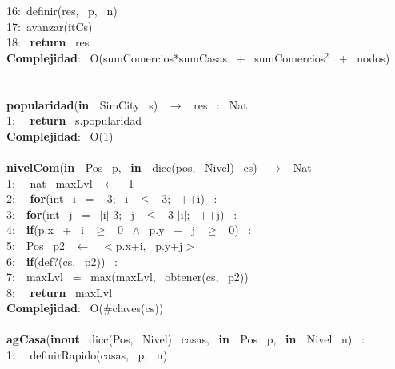 \begin{Algoritmos}
    16:\indent \indent \indent  \ definir(res, \ p, \ n)\\
    17:\indent \indent  \ avanzar(itCs)\\
    18: \ \textbf{return} \ res\\
    \textbf{Complejidad}: \ O(sumComercios*sumCasas \ + \ sumComercios$^2$ \ + \ nodos)\\
    \noindent\makebox[\linewidth]{\rule{\textwidth}{0.4pt}}
    \\
    \pagebreak\\
    \noindent\makebox[\linewidth]{\rule{\textwidth}{0.4pt}}
    \textbf{popularidad}(\textbf{in \ }SimCity \ s) \ $\rightarrow $ \ res \ : \ Nat\\
    1: \  \ \textbf{return} \ s.popularidad\\
    \textbf{Complejidad}: \ O(1)\\
    \noindent\makebox[\linewidth]{\rule{\textwidth}{0.4pt}}
    \\
    \noindent\makebox[\linewidth]{\rule{\textwidth}{0.4pt}}
    \textbf{nivelCom}(\textbf{in \ }Pos \ p, \ \textbf{in \ }dicc(pos, \ Nivel) \ cs) \ $\rightarrow $ \ Nat\\
    1: \  \ nat \ maxLvl \ $\leftarrow$ \ 1\\
    2: \  \ \textbf{for}(int \ i \ = \ -3; \ i \ $\leq$ \ 3; \ ++i) \ :\\
    3:\indent  \  \ \textbf{for}(int \ j \ = \ $\mid$i$\mid$-3; \ j \ $\leq$ \ 3-$\mid$i$\mid$; \ ++j) \ :\\
    4:\indent \indent  \  \ \textbf{if}(p.x \ + \ i \ $\geq$ \ 0 \ $\wedge$ \ p.y \ + \ j \ $\geq$ \ 0) \ :\\
    5:\indent \indent \indent  \  \ Pos \ p2 \ $\leftarrow$ \ $<$p.x+i, \ p.y+j$>$ \ \\
    6:\indent \indent \indent  \  \ \textbf{if}(def?(cs, \ p2)) \ :\\
    7:\indent \indent \indent \indent  \  \ maxLvl \ = \ max(maxLvl, \ obtener(cs, \ p2))\\
    8: \  \ \textbf{return} \ maxLvl\\
    \textbf{Complejidad}: \ O($ \# $claves(cs))\\
    \noindent\makebox[\linewidth]{\rule{\textwidth}{0.4pt}}
    \\
    \noindent\makebox[\linewidth]{\rule{\textwidth}{0.4pt}}
    \textbf{agCasa}(\textbf{inout} \ dicc(Pos, \ Nivel) \ casas, \ \textbf{in \ }Pos \ p, \ \textbf{in \ }Nivel \ n) \ :\\
    1: \  \ definirRapido(casas, \ p, \ n)\\

\end{Algoritmos}
